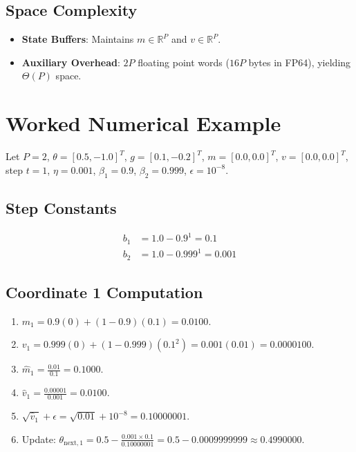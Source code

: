 \documentclass[11pt,a4paper]{article}
\theoremstyle{definition}
\begin{document}
\subsection{Space Complexity}
\begin{itemize}
    \item \textbf{State Buffers}: Maintains $m \in \mathbb{R}^P$ and $v \in \mathbb{R}^P$.
    \item \textbf{Auxiliary Overhead}: $2P$ floating point words ($16P$ bytes in FP64), yielding $\Theta(P)$ space.
\end{itemize}

\section{Worked Numerical Example}

Let $P=2$, $\theta = [0.5, -1.0]^T$, $g = [0.1, -0.2]^T$, $m = [0.0, 0.0]^T$, $v = [0.0, 0.0]^T$, step $t=1$, $\eta = 0.001$, $\beta_1 = 0.9$, $\beta_2 = 0.999$, $\epsilon = 10^{-8}$.

\subsection{Step Constants}
\begin{align}
b_1 &= 1.0 - 0.9^1 = 0.1 \\
b_2 &= 1.0 - 0.999^1 = 0.001
\end{align}

\subsection{Coordinate 1 Computation}
\begin{enumerate}
    \item $m_1 = 0.9(0) + (1 - 0.9)(0.1) = 0.0100$.
    \item $v_1 = 0.999(0) + (1 - 0.999)(0.1^2) = 0.001(0.01) = 0.0000100$.
    \item $\hat{m}_1 = \frac{0.01}{0.1} = 0.1000$.
    \item $\hat{v}_1 = \frac{0.00001}{0.001} = 0.0100$.
    \item $\sqrt{\hat{v}_1} + \epsilon = \sqrt{0.01} + 10^{-8} = 0.10000001$.
    \item Update: $\theta_{\text{next}, 1} = 0.5 - \frac{0.001 \times 0.1}{0.10000001} = 0.5 - 0.0009999999 \approx 0.4990000$.
\end{enumerate}
\end{document}
